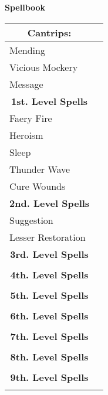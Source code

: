 \documentclass[11pt]{article}
\newcommand{\done}{\rlap{$\square$}{\raisebox{2pt}{\large\hspace{1pt}\ding{51}}}}
\begin{document}
\clearpage

	\begin{center}
{\LARGE \textbf{Spellbook}}
	\end{center}

	\begin{tabularx}{\textwidth}{X|r}
\multicolumn{1}{c|}{\large \textbf{Cantrips}:} & \\
\hline
Mending 										& 	\\
Vicious Mockery 								& 	\\
Message		 									&	\\

\multicolumn{1}{c|}{\large \textbf{1st. Level Spells}} & \\
\hline
Faery Fire			 							& \done \\
Heroism 										& \done \\
Sleep											& \done \\
Thunder Wave 									& \done \\
Cure Wounds				 						& \done \\

\multicolumn{1}{c|}{\large \textbf{2nd. Level Spells}} &	\\
\hline
Suggestion										& \done	\\
Lesser Restoration								& \done \\

\multicolumn{1}{c|}{\large \textbf{3rd. Level Spells}} & \\
\hline
 												&  	\\

\multicolumn{1}{c|}{\large \textbf{4th. Level Spells}} & \\
\hline
 												&  	\\

\multicolumn{1}{c|}{\large \textbf{5th. Level Spells}} & \\
\hline
	 											&  	\\

\multicolumn{1}{c|}{\large \textbf{6th. Level Spells}} & \\
\hline
	 											&  	\\

\multicolumn{1}{c|}{\large \textbf{7th. Level Spells}} & \\
\hline
	 											&  	\\

\multicolumn{1}{c|}{\large \textbf{8th. Level Spells}} & \\
\hline
	 											&  	\\

\multicolumn{1}{c|}{\large \textbf{9th. Level Spells}} & \\
\hline
	 											&
	\end{tabularx}
\end{document}
